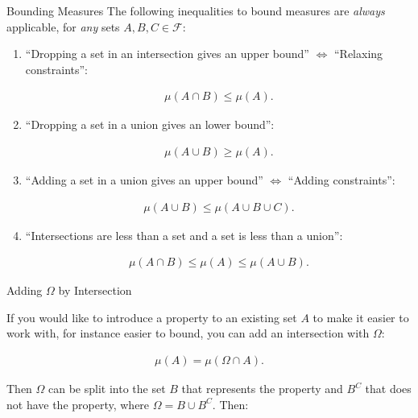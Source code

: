 \documentclass[10pt,landscape]{article}
\renewcommand{\leq}{\leqslant}
\renewcommand{\geq}{\geqslant}
\newcommand{\CalF}{\mathcal{F}}
\begin{document}
\begin{multicols}{3}
\begin{observation}{}{Bounding Measures}
    The following inequalities to bound measures are \emph{always} applicable, for \emph{any} sets $A, B, C \in \CalF$:

    \begin{enumerate}
        \item ``Dropping a set in an intersection gives an upper bound'' $\Leftrightarrow$ ``Relaxing constraints'':

            \begin{align*}
                \mu(A \cap B) \leq \mu(A).
            \end{align*}
        \item ``Dropping a set in a union gives an lower bound'':

            \begin{align*}
                \mu(A \cup B) \geq \mu(A).
            \end{align*}
        \item ``Adding a set in a union gives an upper bound'' $\Leftrightarrow$ ``Adding constraints'':

            \begin{align*}
                \mu(A \cup B) \leq \mu(A \cup B \cup C).
            \end{align*}
        \item ``Intersections are less than a set and a set is less than a union'':

            \begin{align*}
                \mu(A \cap B) \leq \mu(A) \leq \mu(A \cup B).
            \end{align*}
    \end{enumerate}

\end{observation}

\begin{observation}{}{Adding $\Omega$ by Intersection}

    If you would like to introduce a property to an existing set $A$ to make it easier to work with, for instance easier to bound, you can add an intersection with $\Omega$:

        \begin{align*}
            \mu(A) = \mu(\Omega \cap A).
        \end{align*}

    Then $\Omega$ can be split into the set $B$ that represents the property and $B^C$ that does not have the property, where $\Omega = B \cup B^C$. Then:


\end{observation}
\end{multicols}
\end{document}

